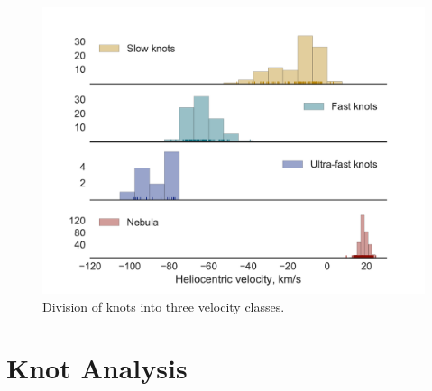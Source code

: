 \documentclass[usenatbib]{mnras}
\begin{document}
\begin{figure}
  \centering
  \includegraphics[width=\linewidth]{knot-histogram-vel}
  \caption{Division of knots into three velocity classes.}
  \label{fig:velocity-classes}
\end{figure}

\section{Knot Analysis}
\label{sec:knot-analysis}
\end{document}
